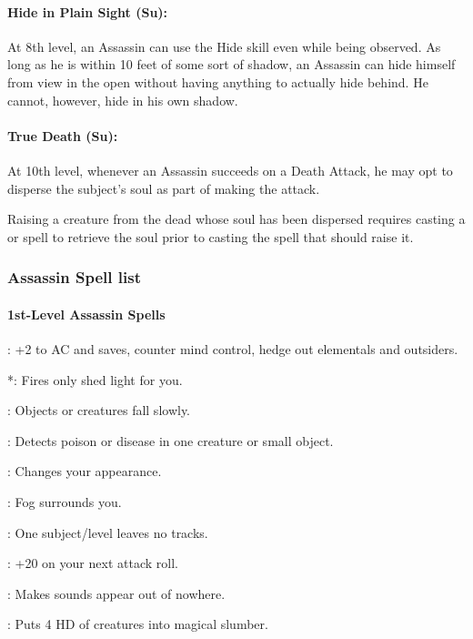 \paragraph{Hide in Plain Sight (Su):}
At 8th level, an Assassin can use the Hide skill even while being observed. 
As long as he is within 10 feet of some sort of shadow, an Assassin can hide himself from view in the open without having anything to actually hide behind. 
He cannot, however, hide in his own shadow.

\paragraph{True Death (Su):}
At 10th level, whenever an Assassin succeeds on a Death Attack, he may opt to disperse the subject's soul as part of making the attack.

Raising a creature from the dead whose soul has been dispersed requires casting a  or  
spell to retrieve the soul prior to casting the spell that should raise it.

\subsubsection{Assassin Spell list}
\paragraph{1st-Level Assassin Spells}
\begin{list}{}{\leftmargin=1em}
\item {}: +2 to AC and saves, counter mind control, hedge out elementals and outsiders.
\item {}*: Fires only shed light for you.
\item {}: Objects or creatures fall slowly.
\item {}: Detects poison or disease in one creature or small object.
\item {}: Changes your appearance.
\item {}: Fog surrounds you.
\item {}: One subject/level leaves no tracks.
\item {}: +20 on your next attack roll.
\item {}: Makes sounds appear out of nowhere.
\item {}: Puts 4 HD of creatures into magical slumber.
\end{list}
